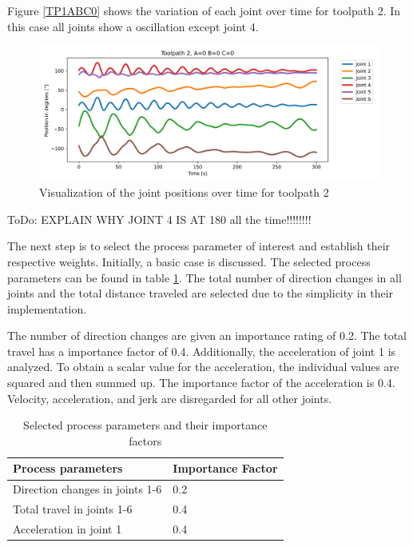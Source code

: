  Figure \ref{TP1ABC0} shows the variation of each joint over time for toolpath 2.
 In this case all joints show a oscillation except joint 4.
\begin{figure}[H]
	\centerline{\includegraphics[width=1\textwidth]{figures/TP2ABC0.png}}
	\caption{Visualization of the joint positions over time for toolpath 2}
	\label{TP2ABC0}
\end{figure}

ToDo: EXPLAIN WHY JOINT 4 IS AT 180 all the time!!!!!!!!\newline

The next step is to select the process parameter of interest and establish their respective weights. Initially, a basic case is discussed. The selected process parameters can be found in table \ref{PPbasic}. The total number of direction changes in all joints and the total distance traveled are selected due to the simplicity in their implementation.

The number of direction changes are given an importance rating of 0.2.
The total travel has a importance factor of 0.4. Additionally, the acceleration of joint 1 is analyzed. To obtain a scalar value for the acceleration, the individual values are squared and then summed up. The importance factor of the acceleration is 0.4.
Velocity, acceleration, and jerk are disregarded for all other joints.

\begin{table}[H]
	\centering
	\begin{tabular}{||l|l||}
		Process parameters& Importance Factor \\
		\hline
		\hline
		\hline
		Direction changes in joints 1-6	&		0.2 \\
		Total travel in joints 1-6	&  	0.4 \\
		Acceleration in joint 1	& 		0.4\\
		
		\hline
		\hline
	\end{tabular}
	
	\caption{Selected process parameters and their importance factors}
	\label{PPbasic}
\end{table}


